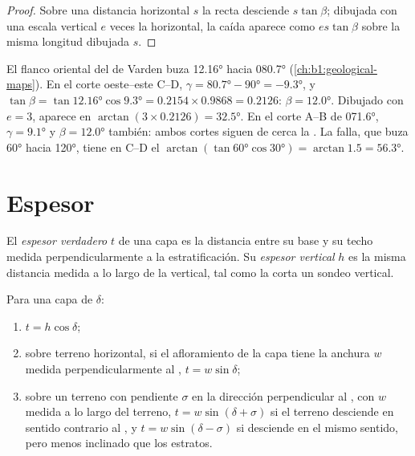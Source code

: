 \begin{proof}
Sobre una distancia horizontal $s$ la recta desciende $s\tan\beta$; dibujada con una escala
vertical $e$ veces la horizontal, la caída aparece como $es\tan\beta$ sobre la misma longitud
dibujada $s$.
\end{proof}

\begin{example}
El flanco oriental del  de Varden buza \ang{12.16} hacia \ang{080.7}
(\cref{ch:b1:geological-maps}). En el corte oeste--este C--D,
$\gamma = \ang{80.7} - \ang{90} = \ang{-9.3}$, y $\tan\beta =
\tan\ang{12.16}\cos\ang{9.3} = 0.2154\times0.9868 = 0.2126$: $\beta =
\ang{12.0}$. Dibujado con $e = 3$, aparece en $\arctan(3\times0.2126) =
\ang{32.5}$. En el corte A--B de  \ang{071.6}, $\gamma = \ang{9.1}$
y $\beta = \ang{12.0}$ también: ambos cortes siguen de cerca la . La falla,
que buza \ang{60} hacia \ang{120}, tiene en C--D el  $\arctan(\tan\ang{60}\cos\ang{30}) = \arctan 1.5 = \ang{56.3}$.
\end{example}

\section{Espesor}

\begin{definition}\label{def:b1:cross-sections:thickness}
El \emph{espesor verdadero} $t$ de una capa es la distancia entre su base y su techo medida
perpendicularmente a la estratificación. Su \emph{espesor vertical} $h$ es la misma distancia
medida a lo largo de la vertical, tal como la corta un sondeo vertical.
\end{definition}

\begin{proposition}\label{prop:b1:cross-sections:thickness}
Para una capa de  $\delta$:
\begin{enumerate}
  \item $t = h\cos\delta$;
  \item sobre terreno horizontal, si el afloramiento de la capa tiene la anchura $w$ medida perpendicularmente al ,
        $t = w\sin\delta$;
  \item sobre un terreno con pendiente $\sigma$ en la dirección perpendicular al , con $w$ medida a lo largo del terreno,
        $t = w\sin(\delta + \sigma)$ si el terreno desciende en sentido contrario al , y
        $t = w\sin(\delta - \sigma)$ si desciende en el mismo sentido, pero menos inclinado que los estratos.
\end{enumerate}
\end{proposition}

